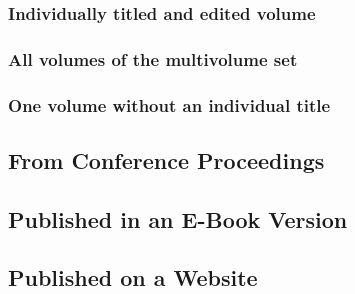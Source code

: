 \documentclass{article}
\begin{document}
\subsubsection{Individually titled and edited volume} %
\label{ssub:individually_titled_and_edited_volume}
\begin{refsection}
	\printbibliography[heading=none]
\end{refsection}
\subsubsection{All volumes of the multivolume set} %
\label{ssub:all_volumes_of_the_multivolume_set}
\begin{refsection}
	\printbibliography[heading=none]
\end{refsection}
\subsubsection{One volume without an individual title} %
\label{ssub:one_volume_without_an_individual_title}
\begin{refsection}
	\printbibliography[heading=none]
\end{refsection}
\subsection{From Conference Proceedings} %
\label{sub:from_conference_proceedings}
\begin{refsection}
	\printbibliography[heading=none]
\end{refsection}
\subsection{Published in an E-Book Version} %
\label{sub:published_in_an_e_book_version}
\begin{refsection}
	\printbibliography[heading=none]
\end{refsection}
\subsection{Published on a Website} %
\label{sub:published_on_a_website}
\begin{refsection}
	\printbibliography[heading=none]
\end{refsection}
\end{document}
